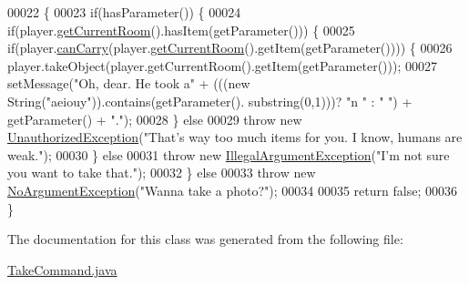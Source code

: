 \begin{DoxyCode}
00022                                                                                                            
               \{
00023         \textcolor{keywordflow}{if}(hasParameter()) \{
00024             \textcolor{keywordflow}{if}(player.\hyperlink{classPlayer_a3a3107df50fc4e35e8c0f46c3f776ce6}{getCurrentRoom}().hasItem(getParameter())) \{
00025                 \textcolor{keywordflow}{if}(player.\hyperlink{classPlayer_ad84aab6c7b6ed8d58608adf0484f0268}{canCarry}(player.\hyperlink{classPlayer_a3a3107df50fc4e35e8c0f46c3f776ce6}{getCurrentRoom}().getItem(getParameter()))) 
      \{
00026                     player.takeObject(player.getCurrentRoom().getItem(getParameter()));
00027                     setMessage(\textcolor{stringliteral}{"Oh, dear. He took a"} + (((\textcolor{keyword}{new} String(\textcolor{stringliteral}{"aeiouy"})).contains(getParameter().
      substring(0,1)))? \textcolor{stringliteral}{"n "} : \textcolor{stringliteral}{" "}) + getParameter() + \textcolor{stringliteral}{"."});
00028                 \} \textcolor{keywordflow}{else}
00029                     \textcolor{keywordflow}{throw} \textcolor{keyword}{new} \hyperlink{classUnauthorizedException}{UnauthorizedException}(\textcolor{stringliteral}{"That's way too much items for
       you. I know, humans are weak."});
00030             \} \textcolor{keywordflow}{else}
00031                 \textcolor{keywordflow}{throw} \textcolor{keyword}{new} \hyperlink{classIllegalArgumentException}{IllegalArgumentException}(\textcolor{stringliteral}{"I'm not sure you want to take
       that."});
00032         \} \textcolor{keywordflow}{else}
00033             \textcolor{keywordflow}{throw} \textcolor{keyword}{new} \hyperlink{classNoArgumentException}{NoArgumentException}(\textcolor{stringliteral}{"Wanna take a photo?"});
00034 
00035         \textcolor{keywordflow}{return} \textcolor{keyword}{false};
00036     \}
\end{DoxyCode}


The documentation for this class was generated from the following file\-:\begin{DoxyCompactItemize}
\item 
\hyperlink{TakeCommand_8java}{Take\-Command.\-java}\end{DoxyCompactItemize}

